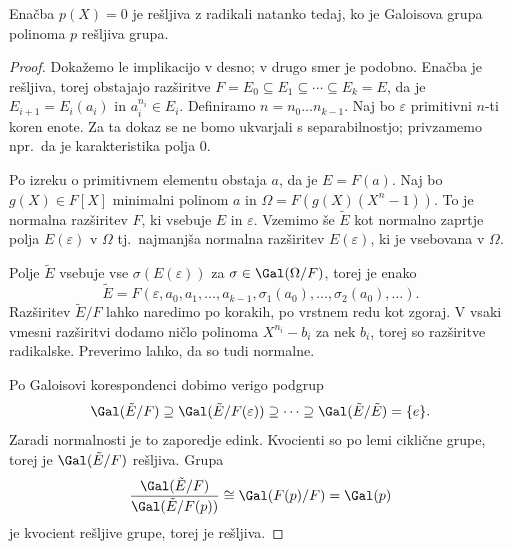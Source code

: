 \begin{izrek}
  Enačba $p(X) = 0$ je rešljiva z radikali natanko tedaj, ko je Galoisova grupa
  polinoma $p$ rešljiva grupa.
\end{izrek}

\begin{proof}
  Dokažemo le implikacijo v desno; v drugo smer je podobno.
  Enačba je rešljiva, torej obstajajo razširitve $F = E_0 \subseteq E_1
  \subseteq \cdots \subseteq E_k = E$, da je $E_{i+1} = E_i(a_i)$ in $a_i^{n_i}
  \in E_i$.
  Definiramo $n = n_0 \ldots n_{k-1}$.
  Naj bo $\varepsilon$ primitivni $n$-ti koren enote.
  Za ta dokaz se ne bomo ukvarjali s separabilnostjo; privzamemo npr.~da je
  karakteristika polja $0$.

  Po izreku o primitivnem elementu obstaja $a$, da je $E = F(a)$.
  Naj bo $g(X) \in F[X]$ minimalni polinom $a$ in $\Omega = F(g(X) (X^n - 1))$.
  To je normalna razširitev $F$, ki vsebuje $E$ in $\varepsilon$.
  Vzemimo še $\tilde{E}$ kot normalno zaprtje polja $E(\varepsilon)$ v $\Omega$
  tj.~najmanjša normalna razširitev $E(\varepsilon)$, ki je vsebovana v
  $\Omega$.

  Polje $\tilde{E}$ vsebuje vse $\sigma(E(\varepsilon))$ za $\sigma \in
  \Gal(\Omega / F)$, torej je enako
  \[
	\tilde{E} = F(\varepsilon, a_0, a_1, \ldots, a_{k-1}, \sigma_1(a_0), \ldots,
	\sigma_2(a_0), \ldots).
  \]
  Razširitev $\tilde{E}/F$ lahko naredimo po korakih, po vrstnem redu kot zgoraj.
  V vsaki vmesni razširitvi dodamo ničlo polinoma $X^{n_i} - b_i$ za nek $b_i$,
  torej so razširitve radikalske.
  Preverimo lahko, da so tudi normalne.

  Po Galoisovi korespondenci dobimo verigo podgrup
  \[
	\Gal(\tilde{E}/F) \supseteq \Gal(\tilde{E}/F(\varepsilon)) \supseteq \cdots
	\supseteq \Gal(\tilde{E}/\tilde{E}) = \{e\}.
  \]
  Zaradi normalnosti je to zaporedje edink.
  Kvocienti so po lemi ciklične grupe, torej je $\Gal(\tilde{E}/F)$ rešljiva.
  Grupa
  \[
	\frac{\Gal(\tilde{E}/F)}{\Gal(\tilde{E}/F(p))} \cong \Gal(F(p)/F) = \Gal(p)
  \]
  je kvocient rešljive grupe, torej je rešljiva.
\end{proof}



